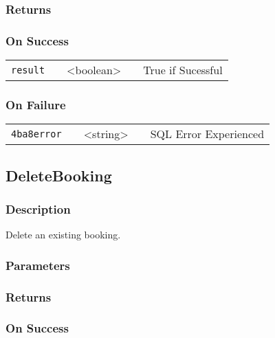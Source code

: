 \documentclass[a4paper,12pt]{article}
\begin{document}
\subsubsection{Returns}

\subsubsection{On Success}

\begin{tabular}{ccccc}
\verb!result! & \vspace{15mm} & <boolean> & \vspace{15mm} & True if Sucessful \\
\end{tabular}

\subsubsection{On Failure}

\begin{tabular}{ccccc}
\verb!4ba8error! & \vspace{15mm} & <string> & \vspace{15mm} & SQL Error Experienced \\
\end{tabular}


\subsection{DeleteBooking}

\subsubsection{Description}

Delete an existing booking.

\subsubsection{Parameters}

\subsubsection{Returns}

\subsubsection{On Success}
\end{document}
